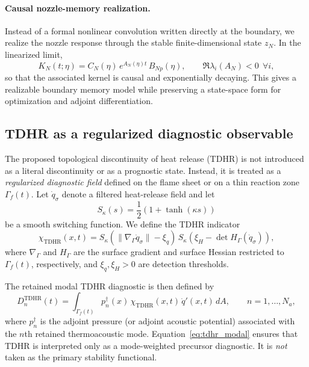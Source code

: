 \paragraph{Causal nozzle-memory realization.}
Instead of a formal nonlinear convolution written directly at the boundary,
we realize the nozzle response through the stable finite-dimensional state $z_N$.
In the linearized limit,
\begin{equation}
K_N(t;\eta)=C_N(\eta)\,e^{A_N(\eta)t}\,B_{Np}(\eta),
\qquad
\Re \lambda_i(A_N)<0
\ \ \forall i,
\label{eq:nozzle_kernel}
\end{equation}
so that the associated kernel is causal and exponentially decaying.
This gives a realizable boundary memory model while preserving a state-space form
for optimization and adjoint differentiation.

\subsection{TDHR as a regularized diagnostic observable}
\label{subsec:tdhr_regularized}

The proposed topological discontinuity of heat release (TDHR) is not introduced as a
literal discontinuity or as a prognostic state.
Instead, it is treated as a \emph{regularized diagnostic field} defined on the flame sheet
or on a thin reaction zone $\Gamma_f(t)$.
Let $\dot q_\sigma$ denote a filtered heat-release field and let
\begin{equation}
S_\kappa(s)=\frac{1}{2}\left(1+\tanh(\kappa s)\right)
\label{eq:smooth_switch}
\end{equation}
be a smooth switching function.
We define the TDHR indicator
\begin{equation}
\chi_{\mathrm{TDHR}}(x,t)
=
S_\kappa\!\left(\|\nabla_{\Gamma}\dot q_\sigma\|-\xi_q\right)
\,
S_\kappa\!\left(\xi_H-\det H_{\Gamma}(\dot q_\sigma)\right),
\label{eq:tdhr_indicator}
\end{equation}
where $\nabla_{\Gamma}$ and $H_{\Gamma}$ are the surface gradient and surface Hessian
restricted to $\Gamma_f(t)$, respectively, and $\xi_q,\xi_H>0$ are detection thresholds.

The retained modal TDHR diagnostic is then defined by
\begin{equation}
D_n^{\mathrm{TDHR}}(t)
=
\int_{\Gamma_f(t)}
p_n^\dagger(x)\,
\chi_{\mathrm{TDHR}}(x,t)\,
\dot q'(x,t)\,dA,
\qquad n=1,\dots,N_a,
\label{eq:tdhr_modal}
\end{equation}
where $p_n^\dagger$ is the adjoint pressure (or adjoint acoustic potential)
associated with the $n$th retained thermoacoustic mode.
Equation~\eqref{eq:tdhr_modal} ensures that TDHR is interpreted only as a
mode-weighted precursor diagnostic.
It is \emph{not} taken as the primary stability functional.

